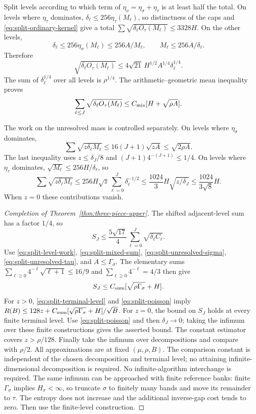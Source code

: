 Split levels according to which term of
$\eta_\nu=\eta_\sigma+\eta_\tau$ is at least half the total.
On levels where $\eta_\tau$ dominates,
$\delta_\ell\le256\eta_\tau(M_\ell)$, so distinctness of the caps and
\eqref{eq:split-ordinary-kernel} give a total
$\sum\sqrt{\delta_\ell O_\tau(M_\ell)}\le3328H$.
On the other levels,
\[
 \delta_\ell\le256\eta_\sigma(M_\ell)\le256A/M_\ell,
 \qquad M_\ell\le256A/\delta_\ell.
\]
Therefore
\[
 \sqrt{\delta_\ell O_\tau(M_\ell)}
 \le4\sqrt{21}\,H^{1/2}A^{1/4}\delta_\ell^{1/4}.
\]
The sum of $\delta_\ell^{1/4}$ over all levels is $\rho^{1/4}$.
The arithmetic--geometric mean inequality proves
\begin{equation}\label{eq:split-mixed-sum}
 \sum_{\ell\le J}\sqrt{\delta_\ell O_\tau(M_\ell)}
 \le C_{\rm mix}[H+\sqrt{\rho A}].
\end{equation}

The work on the unresolved mass is controlled separately.
On levels where $\eta_\sigma$ dominates,
\begin{equation}\label{eq:split-unresolved-sigma}
 \sum\sqrt{z\delta_\ell M_\ell}
 \le16(J+1)\sqrt{zA}\le\sqrt{2\rho A}.
\end{equation}
The last inequality uses $z\le\delta_J/8$ and
$(J+1)4^{-(J+1)}\le1/4$.
On levels where $\eta_\tau$ dominates,
$\sqrt{M_\ell}\le256H/\delta_\ell$, so
\begin{equation}\label{eq:split-unresolved-tau}
 \sum\sqrt{z\delta_\ell M_\ell}
 \le256H\sqrt z\sum_{\ell=0}^J\delta_\ell^{-1/2}
 \le\frac{1024}{3}H\sqrt{z/\delta_J}
 \le\frac{1024}{3\sqrt8}H.
\end{equation}
When $z=0$ these contributions vanish.

\begin{proof}[Completion of Theorem~\ref{thm:three-piece-upper}]
The shifted adjacent-level sum has a factor $1/4$, so
\[
 S_J\le\frac{5\sqrt{17}}4
                \sum_{\ell=0}^J\sqrt{\delta_\ell C_\ell}.
\]
Use \eqref{eq:split-level-work}, \eqref{eq:split-mixed-sum},
\eqref{eq:split-unresolved-sigma}, \eqref{eq:split-unresolved-tau},
and $A\le\Gamma_\sigma$. The elementary sums
$\sum_{\ell\ge0}4^{-\ell}\sqrt{\ell+1}\le16/9$ and
$\sum_{\ell\ge0}4^{-\ell}=4/3$ then give
\[
 S_J\le C_{\rm sum}[\sqrt{\rho\Gamma_\sigma}+H].
\]
For $z>0$, \eqref{eq:split-terminal-level} and
\eqref{eq:split-poisson} imply
$R(B)\le128z+C_{\rm sum}[\sqrt{\rho\Gamma_\sigma}+H]/\sqrt B$.
For $z=0$, the bound on $S_J$ holds at every finite terminal level.
Use \eqref{eq:split-poisson} and then $\delta_J\to0$; taking the infimum
over these finite constructions gives the asserted bound.
The constant estimator covers $z>\rho/128$.
Finally take the infimum over decompositions and compare with $\rho/2$.
All approximations are at fixed $(\mu,\rho,B)$. The comparison constant
is independent of the chosen decomposition and terminal level; no
attaining infinite-dimensional decomposition is required.
No infinite-algorithm interchange is required. The same infimum can be
approached with finite reference banks: finite $\Gamma_\sigma$ implies
$H_\sigma<\infty$, so truncate $\sigma$ to finitely many bands and move its
remainder to $\tau$. The entropy does not increase and the additional
inverse-gap cost tends to zero. Then use the finite-level construction.
\end{proof}
